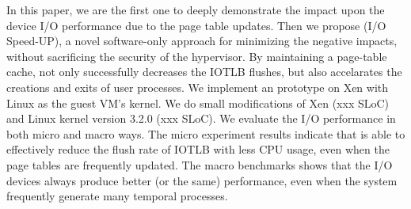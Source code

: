 \documentclass[letterpaper,twocolumn,10pt]{article}
\begin{document}
In this paper, we are the first one to deeply demonstrate the impact upon the device I/O performance due to the page table updates. Then we propose \name (I/O Speed-UP), a novel software-only approach for minimizing the negative impacts, without sacrificing the security of the hypervisor.
By maintaining a page-table cache, \name not only successfully decreases the IOTLB flushes, but also accelarates the creations and exits of user processes.
We implement an prototype on Xen with Linux as the guest VM's kernel. We do small modifications of Xen (xxx SLoC) and Linux kernel version 3.2.0 (xxx SLoC). We evaluate the I/O performance in both micro and macro ways. The micro experiment results indicate that \name is able to effectively reduce the flush rate of IOTLB with less CPU usage, even when the page tables are frequently updated. The macro benchmarks shows that the I/O devices always produce better (or the same) performance, even when the system frequently generate many temporal processes.






%
%
%

%
%
%






{


}
\end{document}
